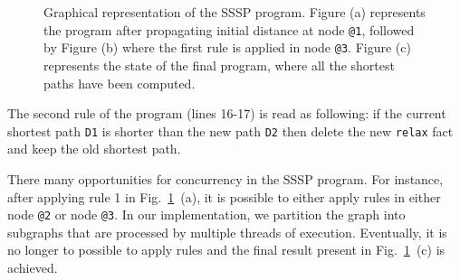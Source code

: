 \begin{figure}[ht]
\begin{center}
  \hspace{0.4cm}
  \hspace{0.4cm}
\end{center}
\caption{Graphical representation of the SSSP program. Figure (a) represents the
   program after propagating initial distance at node \texttt{@1}, followed by
   Figure (b) where the first rule is applied in node \texttt{@3}. Figure (c)
   represents the state of the final program, where all the shortest paths
   have been computed.}
\label{fig:shortest_path_program}
\end{figure}

The second rule of the program (lines 16-17) is read as following: if the
current shortest path \texttt{D1} is shorter than the new path \texttt{D2} then
delete the new \texttt{relax} fact and keep the old shortest path.

There many opportunities for concurrency in the SSSP program. For instance,
after applying rule 1 in Fig.~\ref{fig:shortest_path_program}~(a), it is
possible to either apply rules in either node \texttt{@2} or node
\texttt{@3}. In our implementation, we partition the graph into subgraphs that
are processed by multiple threads of execution. Eventually, it is no longer to
possible to apply rules and the final result present in
Fig.~\ref{fig:shortest_path_program}~(c) is achieved.

